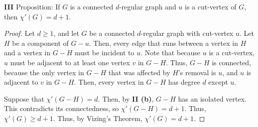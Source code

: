\documentclass[12pt]{article}
\begin{document}
\medskip\noindent\textbf{III} Proposition: If $G$ is a connected $d$-regular graph and $u$ is a cut-vertex of $G$, then $\chi'(G) = d+1$.
\begin{proof}
    Let $d \geq 1$, and let $G$ be a connected $d$-regular graph with cut-vertex $u$.
    Let $H$ be a component of $G-u$.
    Then, every edge that runs between a vertex in $H$ and a vertex in $G-H$ must be incident to $u$.
    Note that because $u$ is a cut-vertex, $u$ must be adjacent to at least one vertex $v$ in $G-H$.
    Thus, $G-H$ is connected, because the only vertex in $G-H$ that was affected by $H$'s removal is $u$, and $u$ is adjacent to $v$ in $G-H$.
    Then, every vertex in $G-H$ has degree $d$ except $u$.

    Suppose that $\chi'(G-H) = d$.
    Then, by \textbf{II (b)}, $G - H$ has an isolated vertex.
    This contradicts its connectedness, so $\chi'(G-H) = d+1$.
    Thus, $\chi'(G) \geq d+1$.
    Thus, by Vizing's Theorem, $\chi'(G) = d + 1$.
\end{proof}
\end{document}
